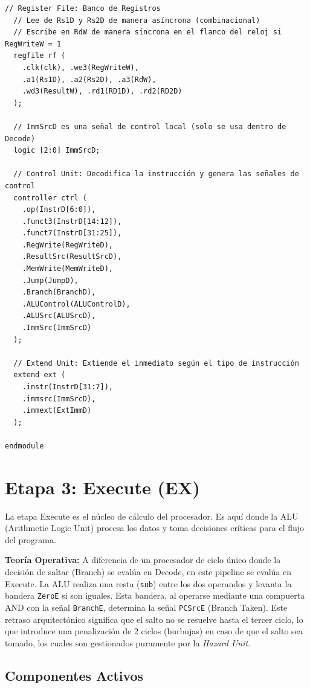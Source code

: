 \documentclass[12pt, a4paper]{article}
\begin{document}
\begin{lstlisting}[style=verilogstyle, caption={Código Verilog de la etapa Decode}]
  // Register File: Banco de Registros
  // Lee de Rs1D y Rs2D de manera asíncrona (combinacional)
  // Escribe en RdW de manera síncrona en el flanco del reloj si RegWriteW = 1
  regfile rf (
    .clk(clk), .we3(RegWriteW),
    .a1(Rs1D), .a2(Rs2D), .a3(RdW),
    .wd3(ResultW), .rd1(RD1D), .rd2(RD2D)
  );

  // ImmSrcD es una señal de control local (solo se usa dentro de Decode)
  logic [2:0] ImmSrcD;

  // Control Unit: Decodifica la instrucción y genera las señales de control
  controller ctrl (
    .op(InstrD[6:0]),
    .funct3(InstrD[14:12]),
    .funct7(InstrD[31:25]),
    .RegWrite(RegWriteD),
    .ResultSrc(ResultSrcD),
    .MemWrite(MemWriteD),
    .Jump(JumpD),
    .Branch(BranchD),
    .ALUControl(ALUControlD),
    .ALUSrc(ALUSrcD),
    .ImmSrc(ImmSrcD)
  );

  // Extend Unit: Extiende el inmediato según el tipo de instrucción
  extend ext (
    .instr(InstrD[31:7]),
    .immsrc(ImmSrcD),
    .immext(ExtImmD)
  );

endmodule
\end{lstlisting}

\section{Etapa 3: Execute (EX)}

La etapa Execute es el núcleo de cálculo del procesador. Es aquí donde la ALU (Arithmetic Logic Unit) procesa los datos y toma decisiones críticas para el flujo del programa.

\textbf{Teoría Operativa:}
A diferencia de un procesador de ciclo único donde la decisión de saltar (Branch) se evalúa en Decode, en este pipeline se evalúa en Execute. La ALU realiza una resta (\texttt{sub}) entre los dos operandos y levanta la bandera \texttt{ZeroE} si son iguales. Esta bandera, al operarse mediante una compuerta AND con la señal \texttt{BranchE}, determina la señal \texttt{PCSrcE} (Branch Taken). 
Este retraso arquitectónico significa que el salto no se resuelve hasta el tercer ciclo, lo que introduce una penalización de 2 ciclos (burbujas) en caso de que el salto sea tomado, los cuales son gestionados puramente por la \textit{Hazard Unit}.

\subsection{Componentes Activos}
\end{document}
